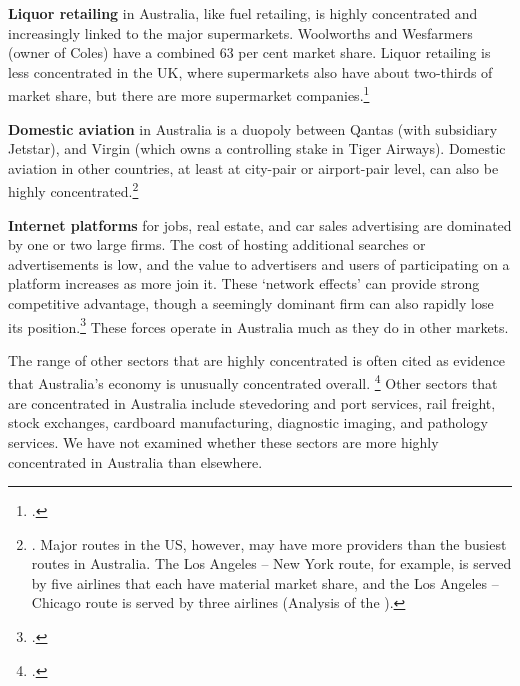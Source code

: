 \textbf{Liquor retailing} in Australia, like fuel retailing, is highly concentrated and increasingly linked to the major supermarkets. Woolworths and Wesfarmers (owner of Coles) have a combined 63 per cent market share. Liquor retailing is less concentrated in the UK, where supermarkets also have about two-thirds of market share, but there are more supermarket companies.\footcite{IAS_liquor_UK}

\textbf{Domestic aviation} in Australia is a duopoly between Qantas (with subsidiary Jetstar), and Virgin (which owns a controlling stake in Tiger Airways). Domestic aviation in other countries, at least at city-pair or airport-pair level, can also be highly concentrated.\footnote{\textcite{GAO_Airlines_US}. Major routes in the US, however, may have more providers than the busiest routes in Australia. The Los Angeles -- New York route, for example, is served by five airlines that each have material market share, and the Los Angeles -- Chicago route is served by three airlines (Analysis of the \textcite{DOT-2017-Origin-Dest-Survey}).}


\textbf{Internet platforms} for jobs, real estate, and car sales advertising are dominated by one or two large firms. The cost of hosting additional searches or advertisements is low, and the value to advertisers and users of participating on a platform increases as more join it. These `network effects' can provide strong competitive advantage, though a seemingly dominant firm can also rapidly lose its position.\footcites{Charney_Recruitment_2015, Dean_RE_2017, Graham_RE_2017, IBISWorldIndustry2017} 
These forces operate in Australia much as they do in other markets. 

The range of other sectors that are highly concentrated is often cited as evidence that Australia's economy is unusually concentrated overall.%
\footcite{Macrobusiness_duopoly_2017} Other sectors that are concentrated in Australia include stevedoring and port services, rail freight, stock exchanges, cardboard manufacturing, diagnostic imaging, and pathology services. We have not examined whether these sectors are more highly concentrated in Australia than elsewhere. 

